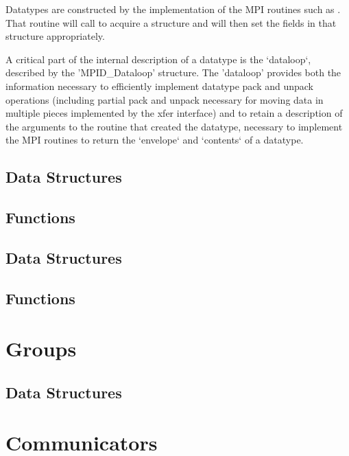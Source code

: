 \documentclass{article}
\begin{document}
Datatypes are constructed by the implementation of the MPI routines such as 
.  That routine will call
 to acquire a structure and will then set the fields
in that structure appropriately. 

A critical part of the internal description of a datatype is the
`dataloop`, described by the 'MPID_Dataloop' structure.  
The 'dataloop' provides both the information necessary to
efficiently implement datatype pack and unpack operations (including
partial pack and unpack necessary for moving data in multiple pieces
implemented by the xfer interface)
and to retain a description of the arguments to the routine that
created the datatype, necessary to implement the MPI routines to
return the `envelope` and `contents` of a datatype.

\subsection{Data Structures}

\subsection{Functions}




\subsection{Data Structures}

\subsection{Functions}


\section{Groups}

\subsection{Data Structures}

%

\section{Communicators}
\end{document}
